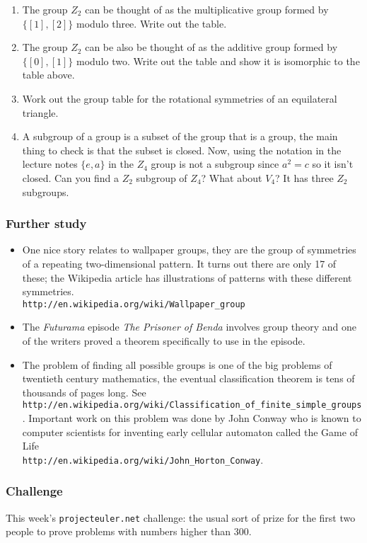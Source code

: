 \documentclass[12pt]{article}
\begin{document}
\begin{enumerate}
\item The group $Z_2$ can be thought of as the multiplicative group formed by $\{[1],[2]\}$ modulo three. Write out the table.
\item The group $Z_2$ can be also be thought of as the additive group
  formed by $\{[0],[1]\}$ modulo two. Write out the table and show it
  is isomorphic to the table above.
\item Work out the group table for the rotational symmetries of an
  equilateral triangle.
\item A subgroup of a group is a subset of the group that is a group,
  the main thing to check is that the subset is closed. Now, using the
  notation in the lecture notes $\{e,a\}$ in the $Z_4$ group is not a
  subgroup since $a^2=c$ so it isn't closed. Can you find a $Z_2$
  subgroup of $Z_4$? What about $V_4$? It has three $Z_2$ subgroups.
\end{enumerate}

\subsubsection*{Further study}
\begin{itemize}
\item One nice story relates to wallpaper groups, they are the group of symmetries of a repeating two-dimensional pattern. It turns out there are only 17 of these; the Wikipedia article has illustrations of patterns with these different symmetries.\\ \texttt{http://en.wikipedia.org/wiki/Wallpaper\_group}
\item The \textsl{Futurama} episode \textsl{The Prisoner of Benda}
  involves group theory and one of the writers proved a theorem
  specifically to use in the episode.
\item The problem of finding all possible groups is one of the big problems of twentieth century mathematics, the eventual classification theorem is tens of thousands of pages long. See \texttt{http://en.wikipedia.org/wiki/Classification\_of\_finite\_simple\_groups}. Important work on this problem was done by John Conway who is known to computer scientists for inventing early cellular automaton called the Game of Life\\ \texttt{http://en.wikipedia.org/wiki/John\_Horton\_Conway}.
\end{itemize}

\subsubsection*{Challenge}
This week's \texttt{projecteuler.net} challenge: the usual sort of prize for the first two people to prove problems with numbers higher than 300.
\end{document}
